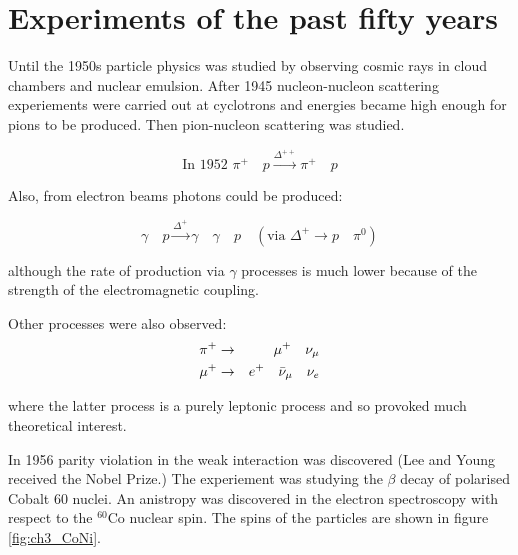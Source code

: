 
\chapter{Experiments of the past fifty years}

Until the 1950s particle physics was studied by observing cosmic rays in cloud chambers and nuclear emulsion.  After 1945 nucleon-nucleon scattering experiements were carried out at cyclotrons and energies became high enough for pions to be produced.  Then pion-nucleon scattering was studied.

\[
  \textrm{In 1952 } \pi^+ \quad p \stackrel{\Delta^{++}}{\to} \pi^+ \quad p
\]

Also, from electron beams photons could be produced:

\[
  \gamma \quad p \stackrel{\Delta^+}{\to} \gamma \quad \gamma \quad p \quad (\textrm{via } \Delta^+ \to p \quad \pi^0 )
\]

although the rate of production via $\gamma$ processes is much lower because of the strength of the electromagnetic coupling.

Other processes were also observed:
\begin{eqnarray*}
  \pi^+ & \to & \mu^+ \quad \nu_{\mu} \\
  \mu^+ & \to & e^+ \quad \bar{\nu}_{\mu} \quad \nu_e
\end{eqnarray*}

where the latter process is a purely leptonic process and so provoked much theoretical interest.

In 1956 parity violation in the weak interaction was discovered (Lee and Young received the Nobel Prize.)  The experiement was studying the $\beta$ decay of polarised Cobalt $60$ nuclei.  An anistropy was discovered in the electron spectroscopy with respect to the $^{60}\textrm{Co}$ nuclear spin. The spins of the particles are shown in figure \ref{fig:ch3_CoNi}.

